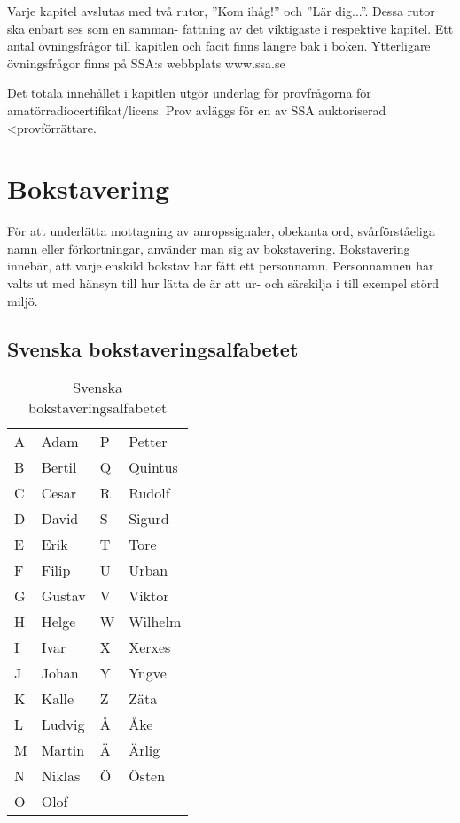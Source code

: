 Varje kapitel avslutas med två rutor, ”Kom ihåg!” och ”Lär dig...”.
Dessa rutor ska enbart ses som en samman- fattning av det viktigaste i
respektive kapitel. Ett antal övningsfrågor till kapitlen och facit
finns längre bak i boken. Ytterligare övningsfrågor finns på SSA:s
webbplats www.ssa.se

Det totala innehållet i kapitlen utgör underlag för provfrågorna för
amatörradiocertifikat/licens. Prov avläggs för en av SSA auktoriserad
<provförrättare.

\section{Bokstavering}

För att underlätta mottagning av anropssignaler, obekanta ord,
svårförståeliga namn eller förkortningar, använder man sig av
bokstavering. Bokstavering innebär, att varje enskild bokstav har fått
ett personnamn. Personnamnen har valts ut med hänsyn till hur lätta de
är att ur- och särskilja i till exempel störd miljö.

\subsection{Svenska bokstaveringsalfabetet}

\begin{table}[h]
  \begin{tabular}{ll|ll}
    A & Adam   & P & Petter  \\
    B & Bertil & Q & Quintus \\
    C & Cesar  & R & Rudolf  \\
    D & David  & S & Sigurd  \\
    E & Erik   & T & Tore    \\
    F & Filip  & U & Urban   \\
    G & Gustav & V & Viktor  \\
    H & Helge  & W & Wilhelm \\
    I & Ivar   & X & Xerxes  \\
    J & Johan  & Y & Yngve   \\
    K & Kalle  & Z & Zäta    \\
    L & Ludvig & Å & Åke     \\
    M & Martin & Ä & Ärlig   \\
    N & Niklas & Ö & Östen   \\
    O & Olof   &   &         \\
  \end{tabular}
  \caption{Svenska bokstaveringsalfabetet}
  \label{tab:sv-bokstavering}
\end{table}

